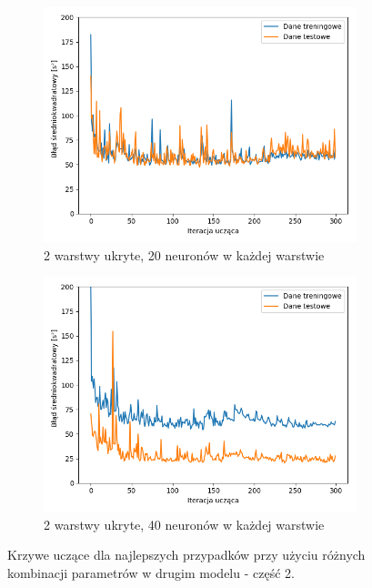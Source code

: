 \documentclass[12pt]{aghdpl}
\begin{document}
		 \begin{figure}[h]
			\centering
		 	\begin{subfigure}{.8\linewidth}
		 		\includegraphics[width =\linewidth]{wykresy/4_zwiekszenie_stopnia_skomplikowania_modelu/2_warstwy_20_neuronow_wykres_uczenia.png}
		 		\caption{2 warstwy ukryte, 20 neuronów w każdej warstwie}
		 	\end{subfigure}
		 	\begin{subfigure}{.8\linewidth}
		 		\includegraphics[width =\linewidth]{wykresy/4_zwiekszenie_stopnia_skomplikowania_modelu/2_warstwy_40_neuronow_wykres_uczenia.png}
		 		\caption{2 warstwy ukryte, 40 neuronów w każdej warstwie}
		 	\end{subfigure}
	 	
 			\caption{Krzywe uczące dla najlepszych przypadków przy użyciu różnych kombinacji parametrów w drugim modelu - część 2.}
			\label{fig: drugi_model_kombinacje_parametrow_wykresy_uczenia_2}
		\end{figure}
		
\end{document}
